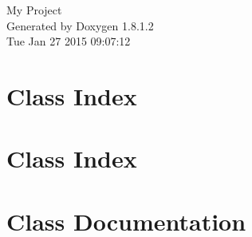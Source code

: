 \documentclass{book}
\begin{document}
\hypersetup{pageanchor=false,citecolor=blue}
\begin{titlepage}
\vspace*{7cm}
\begin{center}
{\Large My Project }\\
\vspace*{1cm}
{\large Generated by Doxygen 1.8.1.2}\\
\vspace*{0.5cm}
{\small Tue Jan 27 2015 09:07:12}\\
\end{center}
\end{titlepage}
\clearemptydoublepage
{}
\tableofcontents
\clearemptydoublepage
{}
\hypersetup{pageanchor=true,citecolor=blue}
\chapter{Class Index}

\chapter{Class Index}

\chapter{Class Documentation}










































\printindex
\end{document}
